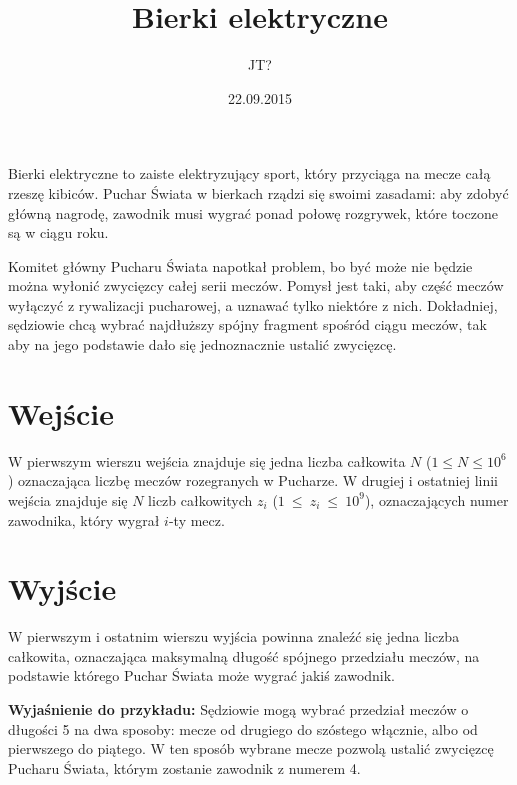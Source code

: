\documentclass[zad,zawodnik,utf8]{sinol}
\title{Bierki elektryczne}
\author{JT?}
\date{22.09.2015}
\begin{document}
  \begin{tasktext}%
Bierki elektryczne to zaiste elektryzujący sport, który przyciąga na mecze całą rzeszę kibiców. Puchar Świata w bierkach rządzi się swoimi zasadami: aby zdobyć główną nagrodę, zawodnik musi wygrać ponad połowę rozgrywek, które toczone są w ciągu roku.

Komitet główny Pucharu Świata napotkał problem, bo być może nie będzie można wyłonić zwycięzcy całej serii meczów. Pomysł jest taki, aby część meczów wyłączyć z rywalizacji pucharowej, a uznawać tylko niektóre z nich. Dokładniej, sędziowie chcą wybrać najdłuższy spójny fragment spośród ciągu meczów, tak aby na jego podstawie dało się jednoznacznie ustalić zwycięzcę.

  \section{Wejście}
W pierwszym wierszu wejścia znajduje się jedna liczba całkowita $N$ ($1 \leq N \leq 10^6$) oznaczająca liczbę meczów rozegranych w Pucharze. W drugiej i ostatniej linii wejścia znajduje się $N$ liczb całkowitych $z_i$ ($1~\leq~z_i~\leq~10^9$), oznaczających numer zawodnika, który wygrał $i$-ty mecz.

  \section{Wyjście}
W pierwszym i ostatnim wierszu wyjścia powinna znaleźć się jedna liczba całkowita, oznaczająca maksymalną długość spójnego przedziału meczów, na podstawie którego Puchar Świata może wygrać jakiś zawodnik.

     \makecompactexample

	\medskip
	\noindent
	\textbf{Wyjaśnienie do przykładu:} Sędziowie mogą wybrać przedział meczów o długości 5 na dwa sposoby: mecze od drugiego do szóstego włącznie, albo od pierwszego do piątego. W ten sposób wybrane mecze pozwolą ustalić zwycięzcę Pucharu Świata, którym zostanie zawodnik z numerem 4.

  \end{tasktext}
\end{document}
